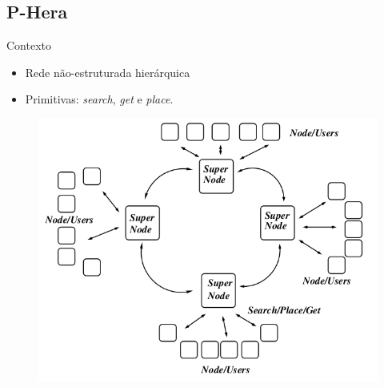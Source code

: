 \documentclass{beamer}
\begin{document}
\subsection{P-Hera}
  \begin{frame}{Contexto}
   \begin{itemize}
    \item Rede não-estruturada hierárquica
    \item Primitivas: \textit{search}, \textit{get} e \textit{place}.
   \end{itemize}
   \begin{figure}[H]
      \includegraphics[scale=0.25]{phera_fig1.png}
   \end{figure}

  \end{frame}
  
\end{document}
